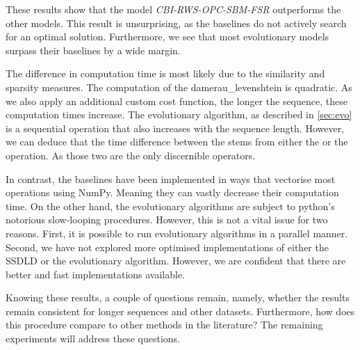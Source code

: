 \documentclass[./../../paper.tex]{subfiles}
\begin{document}
These results show that the model \emph{CBI-RWS-OPC-SBM-FSR} outperforms the other models. This result is unsurprising, as the baselines do not actively search for an optimal solution. Furthermore, we see that most evolutionary models surpass their baselines by a wide margin. 

The difference in computation time is most likely due to the similarity and sparsity measures. The computation of the \gls{damerau_levenshtein} is quadratic. As we also apply an additional custom cost function, the longer the sequence, these computation times increase. The evolutionary algorithm, as described in \autoref{sec:evo} is a sequential operation that also increases with the sequence length. However, we can deduce that the time difference between the  stems from either the  or the  operation. As those two are the only discernible operators. 

In contrast, the baselines have been implemented in ways that vectorise most operations using NumPy. Meaning they can vastly decrease their computation time. On the other hand, the evolutionary algorithms are subject to python's notorious slow-looping procedures. However, this is not a vital issue for two reasons. First, it is possible to run evolutionary algorithms in a parallel manner. Second, we have not explored more optimised implementations of either the \gls{SSDLD} or the evolutionary algorithm. However, we are confident that there are better and fast implementations available. 

Knowing these results, a couple of questions remain, namely, whether the results remain consistent for longer sequences and other datasets. Furthermore, how does this procedure compare to other methods in the literature? The remaining experiments will address these questions. 
\end{document}
